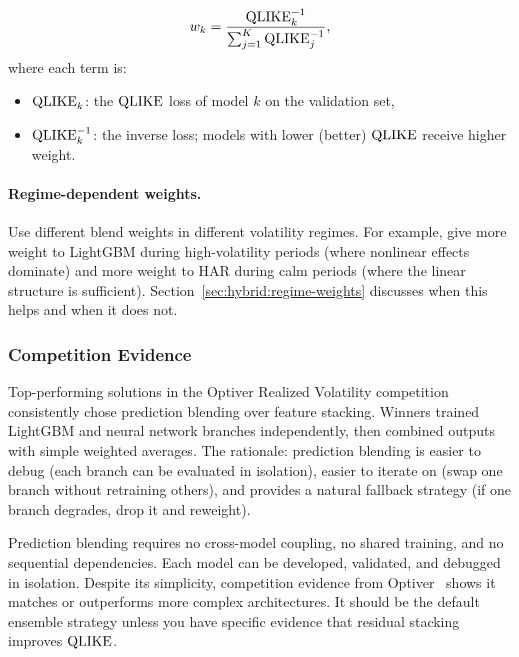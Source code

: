 \begin{equation}\label{eq:inv-qlike-weights}
  w_k = \frac{\operatorname{QLIKE}_k^{-1}}{\sum_{j=1}^{K}\operatorname{QLIKE}_j^{-1}},
\end{equation}
where each term is:
\begin{itemize}
  \item $\operatorname{QLIKE}_k$: the $\operatorname{QLIKE}$ loss of model $k$ on the
        validation set,
  \item $\operatorname{QLIKE}_k^{-1}$: the inverse loss; models with lower
        (better) $\operatorname{QLIKE}$ receive higher weight.
\end{itemize}

\paragraph{Regime-dependent weights.}
Use different blend weights in different volatility regimes.  For
example, give more weight to LightGBM during high-volatility periods
(where nonlinear effects dominate) and more weight to HAR during calm
periods (where the linear structure is sufficient).
Section~\ref{sec:hybrid:regime-weights} discusses when this helps and
when it does not.

\subsubsection{Competition Evidence}

Top-performing solutions in the Optiver Realized Volatility
competition~\citep{Optiver2021} consistently chose prediction blending
over feature stacking.  Winners trained LightGBM and neural network
branches independently, then combined outputs with simple weighted
averages.  The rationale: prediction blending is easier to debug
(each branch can be evaluated in isolation), easier to iterate on
(swap one branch without retraining others), and provides a natural
fallback strategy (if one branch degrades, drop it and reweight).

\begin{keyidea}
Prediction blending requires no cross-model coupling, no shared
training, and no sequential dependencies.  Each model can be
developed, validated, and debugged in isolation.  Despite its
simplicity, competition evidence from Optiver~\citep{Optiver2021}
shows it matches or outperforms more complex architectures.  It should
be the default ensemble strategy unless you have specific evidence that
residual stacking improves $\operatorname{QLIKE}$.
\end{keyidea}



